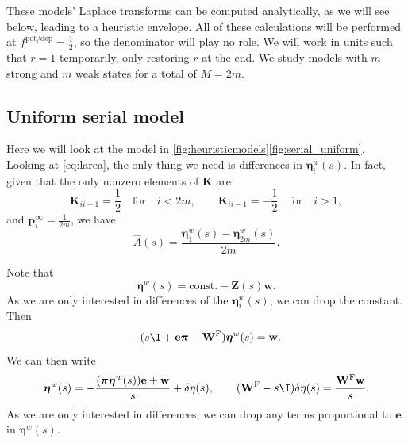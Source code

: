 \documentclass[12pt]{article}
\newcommand{\onev}{\mathbf{e}}
\newcommand{\pr}{\mathbf{p}}
\newcommand{\eq}{\pr^\infty}
\newcommand{\fund}{\mathbf{Z}}
\newcommand{\pib}{\boldsymbol{\pi}}
\newcommand{\etw}{\boldsymbol{\eta}^w}
\newcommand{\w}{\mathbf{w}}
\newcommand{\W}{\mathbf{W}}
\newcommand{\enc}{\mathbf{K}}
\newcommand{\frg}{\W^{\mathrm{F}}}
\newcommand{\potdep}{^{\text{pot/dep}}}
\begin{document}
These models' Laplace transforms can be computed analytically, as we will see below, leading to a heuristic envelope.
All of these calculations will be performed at $f\potdep=\frac{1}{2}$, so the denominator will play no role.
We will work in units such that $r=1$ temporarily, only restoring $r$ at the end.
We study models with \(m\) strong and \(m\) weak states for a total of  \(M = 2 m\).


\subsection{Uniform serial model}\label{sec:serial_uniform}


Here we will look at the model in \autoref{fig:heuristicmodels}\ref{fig:serial_uniform}.
Looking at \eqref{eq:larea}, the only thing we need is differences in $\etw_i(s)$.
In fact, given that the only nonzero elements of $\enc$ are
%
\begin{equation}\label{eq:unienc}
  \enc_{ii+1}=\frac{1}{2} \quad\text{for}\quad i<2m,
  \qquad
  \enc_{ii-1}=-\frac{1}{2} \quad\text{for}\quad i>1,
\end{equation}
%
and $\eq_i = \frac{1}{2m}$, we have
%
\begin{equation}\label{eq:uniareaeta}
  \hat{A}(s) = \frac{\etw_1(s) - \etw_{2m}(s)}{2m}.
\end{equation}
%

Note that
%
\begin{equation}\label{eq:etafund}
  \etw(s) = \text{const.} - \fund(s)\w.
\end{equation}
%
As we are only interested in differences of the $\etw_i(s)$, we can drop the constant.
Then
%
\begin{equation}\label{eq:etarecur}
  -(s\I + \onev\pib - \frg)\etw(s) = \w.
\end{equation}
%
We can then write
%
\begin{equation}\label{eq:detarecur}
  \etw(s) = -\frac{(\pib\etw(s))\onev+\w}{s} + \delta\eta(s),
  \qquad
  (\frg-s\I)\delta\eta(s) = \frac{\frg\w}{s}.
\end{equation}
%
As we are only interested in differences, we can drop any terms proportional to $\onev$ in $\etw(s)$.
\end{document}
